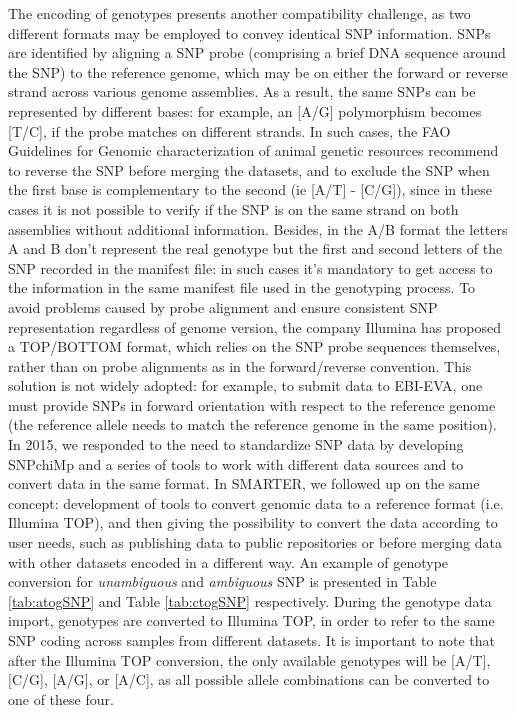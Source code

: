 \documentclass[a4paper,num-refs,gigabyte]{oup-contemporary}
\begin{document}
The encoding of genotypes presents another compatibility challenge, as two different formats may be employed to convey identical SNP information. SNPs are identified by aligning a SNP probe (comprising a brief DNA sequence around the SNP) to the reference genome, which may be on either the forward or reverse strand across various genome assemblies. As a result, the same SNPs can be represented by different bases: for example, an [A/G] polymorphism becomes [T/C], if the probe matches on different strands. In such cases, the FAO Guidelines for Genomic characterization of animal genetic resources\citep{Ajmone23} recommend to reverse the SNP before merging the datasets, and to exclude the SNP when the first base is complementary to the second (ie [A/T] - [C/G]), since in these cases it is not possible to verify if the SNP is on the same strand on both assemblies without additional information.
Besides, in the A/B format the letters A and B don’t represent the real genotype but the first and second letters of the SNP recorded in the manifest file: in such cases it’s mandatory to get access to the information in the same manifest file used in the genotyping process.
To avoid problems caused by probe alignment and ensure consistent SNP representation regardless of genome version, the company Illumina has proposed a TOP/BOTTOM format\citep{IlluminaTOP}, which relies on the SNP probe sequences themselves, rather than on probe alignments as in the forward/reverse convention. This solution is not widely adopted: for example, to submit data to EBI-EVA\citep{EVASubmit}, one must provide SNPs in forward orientation with respect to the reference genome (the reference allele needs to match the reference genome in the same position\citep{AssemblyChecker}).
In 2015, we responded to the need to standardize SNP data\citep{Nicolazzi2015a} by developing SNPchiMp\citep{Nicolazzi2015b} and a series of tools to work with different data sources and to convert data in the same format\citep{Nicolazzi2016}. In SMARTER, we followed up on the same concept: development of tools to convert genomic data to a reference format (i.e. Illumina TOP), and then giving the possibility to convert the data according to user needs, such as publishing data to public repositories or before merging data with other datasets encoded in a different way. An example of genotype conversion for \emph{unambiguous} and \emph{ambiguous} SNP is presented in Table \ref{tab:atogSNP} and Table \ref{tab:ctogSNP} respectively. During the genotype data import, genotypes are converted to Illumina TOP, in order to refer to the same SNP coding across samples from different datasets. It is important to note that after the Illumina TOP conversion, the only available genotypes will be [A/T], [C/G], [A/G], or [A/C], as all possible allele combinations can be converted to one of these four.
\end{document}
